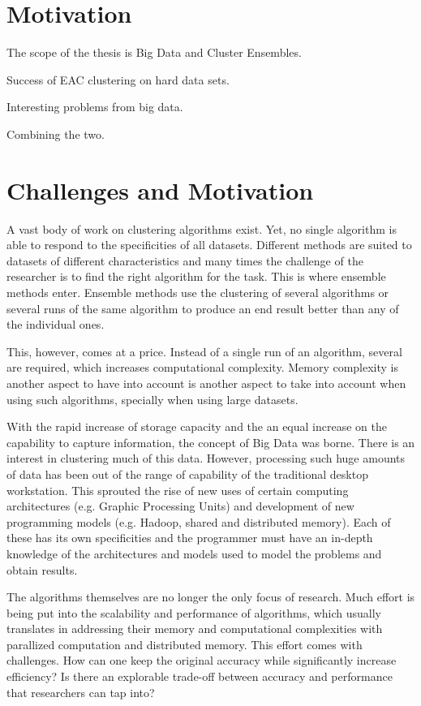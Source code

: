 \section{Motivation}
The scope of the thesis is Big Data and Cluster Ensembles.

Success of EAC clustering on hard data sets.

Interesting problems from big data.

Combining the two.

\section{Challenges and Motivation}

A vast body of work on clustering algorithms exist. Yet, no single algorithm is able to respond to the specificities of all datasets. Different methods are suited to datasets of different characteristics and many times the challenge of the researcher is to find the right algorithm for the task. This is where ensemble methods enter. Ensemble methods use the clustering of several algorithms or several runs of the same algorithm to produce an end result better than any of the individual ones.

This, however, comes at a price. Instead of a single run of an algorithm, several are required, which increases computational complexity. Memory complexity is another aspect to have into account is another aspect to take into account when using such algorithms, specially when using large datasets.

With the rapid increase of storage capacity and the an equal increase on the capability to capture information, the concept of Big Data was borne. There is an interest in clustering much of this data. However, processing such huge amounts of data has been out of the range of capability of the traditional desktop workstation. This sprouted the rise of new uses of certain computing architectures (e.g. Graphic Processing Units) and development of new programming models (e.g. Hadoop, shared and distributed memory). Each of these has its own specificities and the programmer must have an in-depth knowledge of the architectures and models used to model the problems and obtain results.

The algorithms themselves are no longer the only focus of research. Much effort is being put into the scalability and performance of algorithms, which usually translates in addressing their memory and computational complexities with parallized computation and distributed memory. This effort comes with challenges. How can one keep the original accuracy while significantly increase efficiency? Is there an explorable trade-off between accuracy and performance that researchers can tap into?


